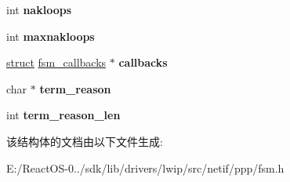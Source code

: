 \begin{DoxyCompactItemize}
\item 
\mbox{\label{structfsm_a97cd965386a76d7a8f187223461cf30f}} 
int {\bfseries nakloops}
\item 
\mbox{\label{structfsm_ada4482525ceed53e0e1379ccbf1ba039}} 
int {\bfseries maxnakloops}
\item 
\mbox{\label{structfsm_a6db46740fd29a4a7691a86792bb78d63}} 
\hyperlink{interfacestruct}{struct} \hyperlink{structfsm__callbacks}{fsm\+\_\+callbacks} $\ast$ {\bfseries callbacks}
\item 
\mbox{\label{structfsm_a038242ebb527a8d34ade85c164605292}} 
char $\ast$ {\bfseries term\+\_\+reason}
\item 
\mbox{\label{structfsm_a64ebd1e78575f07849760d39af3529a4}} 
int {\bfseries term\+\_\+reason\+\_\+len}
\end{DoxyCompactItemize}


该结构体的文档由以下文件生成\+:\begin{DoxyCompactItemize}
\item 
E\+:/\+React\+O\+S-\/0../sdk/lib/drivers/lwip/src/netif/ppp/fsm.\+h\end{DoxyCompactItemize}
